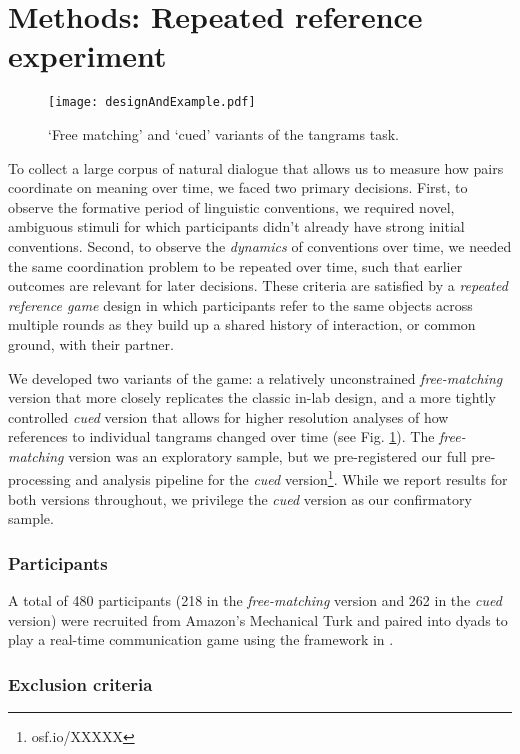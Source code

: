 \section{Methods: Repeated reference experiment}

\begin{figure}
\centering
\texttt{[image: designAndExample.pdf]}
\caption{`Free matching' and `cued' variants of the tangrams task.}
\label{fig:design}
\end{figure}

To collect a large corpus of natural dialogue that allows us to measure how pairs coordinate on meaning over time, we faced two primary decisions.
First, to observe the formative period of linguistic conventions, we required novel, ambiguous stimuli for which participants didn't already have strong initial conventions.
Second, to observe the \emph{dynamics} of conventions over time, we needed the same coordination problem to be repeated over time, such that earlier outcomes are relevant for later decisions.
These criteria are satisfied by a \emph{repeated reference game} design in which participants refer to the same objects across multiple rounds as they build up a shared history of interaction, or common ground, with their partner. 

We developed two variants of the game: a relatively unconstrained \emph{free-matching} version that more closely replicates the classic in-lab design, and a more tightly controlled \emph{cued} version that allows for higher resolution analyses of how references to individual tangrams changed over time (see Fig. \ref{fig:design}). 
The \emph{free-matching} version was an exploratory sample, but we pre-registered our full pre-processing and analysis pipeline for the \emph{cued} version\footnote{osf.io/XXXXX}. While we report results for both versions throughout, we privilege the \emph{cued} version as our confirmatory sample.

\subsubsection{Participants}\label{participants}

A total of 480 participants (218 in the \emph{free-matching} version and 262 in the \emph{cued} version) were recruited from Amazon's Mechanical Turk and paired into dyads to play a real-time communication game using the framework in \cite{Hawkins15_RealTimeWebExperiments}. 

\subsubsection{Exclusion criteria}

